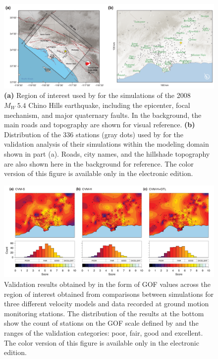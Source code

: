\begin{figure}[ht!]
    \centering
    \includegraphics[width=\textwidth]{figures/pdf/figure-01}
    \caption{\textbf{(a)} Region of interest used by \citet{Taborda_2014_BSSA} for the simulations of the 2008 $M_W ~ 5.4$ Chino Hills earthquake, including the epicenter, focal mechanism, and major quaternary faults. In the background, the main roads and topography are shown for visual reference. \textbf{(b)} Distribution of the 336 stations (gray dots) used by \citet{Taborda_2014_BSSA} for the validation analysis of their simulations within the modeling domain shown in part (a). Roads, city names, and the hillshade topography are also shown here in the background for reference. The color version of this figure is available only in the electronic edition.}
    \label{fig:chino-hills}
\end{figure}

\begin{figure}[t]
    \centering
    \includegraphics[width=\textwidth]{figures/pdf/figure-02}
    \caption{Validation results obtained by \citet{Taborda_2014_BSSA} in the form of GOF values across the region of interest obtained from comparisons between simulations for three different velocity models and data recorded at ground motion monitoring stations. The distribution of the results at the bottom show the count of stations on the GOF scale defined by \citet{Anderson_2004_Proc} and the ranges of the validation categories: poor, fair, good and excellent. The color version of this figure is available only in the electronic edition.}
    \label{fig:ref-gof-maps}
\end{figure}

